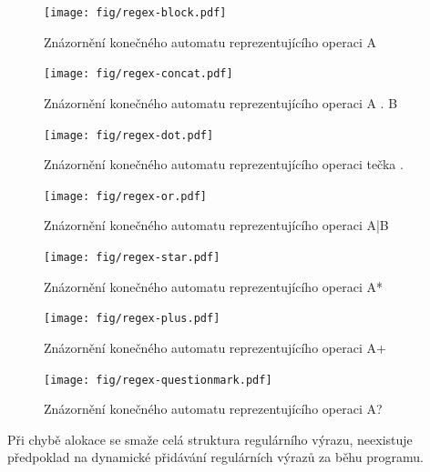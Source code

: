 \begin{figure}[!htb]
	\centering
	\texttt{[image: fig/regex-block.pdf]}
	\caption{Znázornění konečného automatu reprezentujícího operaci A}
\end{figure}\label{fig:regex-block}

\begin{figure}[!htb]
	\centering
	\texttt{[image: fig/regex-concat.pdf]}
	\caption{Znázornění konečného automatu reprezentujícího operaci A . B}
\end{figure}\label{fig:regex-concat}

\begin{figure}[!htb]
	\centering
	\texttt{[image: fig/regex-dot.pdf]}
	\caption{Znázornění konečného automatu reprezentujícího operaci tečka .}
\end{figure}\label{fig:regex-dot}

\begin{figure}[!htb]
	\centering
	\texttt{[image: fig/regex-or.pdf]}
	\caption{Znázornění konečného automatu reprezentujícího operaci A|B}
\end{figure}\label{fig:regex-or}

\begin{figure}[!htb]
	\centering
	\texttt{[image: fig/regex-star.pdf]}
	\caption{Znázornění konečného automatu reprezentujícího operaci A*}
\end{figure}\label{fig:regex-star}

\begin{figure}[!htb]
	\centering
	\texttt{[image: fig/regex-plus.pdf]}
	\caption{Znázornění konečného automatu reprezentujícího operaci A+}
\end{figure}\label{fig:regex-plus}

\begin{figure}[!htb]
	\centering
	\texttt{[image: fig/regex-questionmark.pdf]}
	\caption{Znázornění konečného automatu reprezentujícího operaci A?}
\end{figure}\label{fig:regex-questionmark}


Při chybě alokace se smaže celá struktura regulárního výrazu, neexistuje předpoklad na
dynamické přidávání regulárních výrazů za běhu programu.

